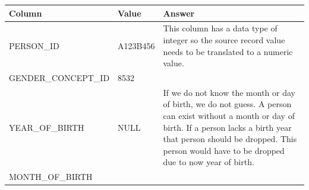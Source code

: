 \documentclass[11pt]{book}
\theoremstyle{definition}
\theoremstyle{definition}
\theoremstyle{definition}
\theoremstyle{remark}
\begin{document}
\begin{longtable}[]{@{}lll@{}}
\toprule
\begin{minipage}[b]{0.23\columnwidth}\raggedright\strut
Column\strut
\end{minipage} & \begin{minipage}[b]{0.16\columnwidth}\raggedright\strut
Value\strut
\end{minipage} & \begin{minipage}[b]{0.32\columnwidth}\raggedright\strut
Answer\strut
\end{minipage}\tabularnewline
\midrule
\endhead
\begin{minipage}[t]{0.23\columnwidth}\raggedright\strut
PERSON\_ID\strut
\end{minipage} & \begin{minipage}[t]{0.16\columnwidth}\raggedright\strut
A123B456\strut
\end{minipage} & \begin{minipage}[t]{0.32\columnwidth}\raggedright\strut
This column has a data type of integer so the source record value needs
to be translated to a numeric value.\strut
\end{minipage}\tabularnewline
\begin{minipage}[t]{0.23\columnwidth}\raggedright\strut
GENDER\_CONCEPT\_ID\strut
\end{minipage} & \begin{minipage}[t]{0.16\columnwidth}\raggedright\strut
8532\strut
\end{minipage} & \begin{minipage}[t]{0.32\columnwidth}\raggedright\strut
\strut
\end{minipage}\tabularnewline
\begin{minipage}[t]{0.23\columnwidth}\raggedright\strut
YEAR\_OF\_BIRTH\strut
\end{minipage} & \begin{minipage}[t]{0.16\columnwidth}\raggedright\strut
NULL\strut
\end{minipage} & \begin{minipage}[t]{0.32\columnwidth}\raggedright\strut
If we do not know the month or day of birth, we do not guess. A person
can exist without a month or day of birth. If a person lacks a birth
year that person should be dropped. This person would have to be dropped
due to now year of birth.\strut
\end{minipage}\tabularnewline
\begin{minipage}[t]{0.23\columnwidth}\raggedright\strut
MONTH\_OF\_BIRTH\strut

\end{minipage}
\end{longtable}
\end{document}
